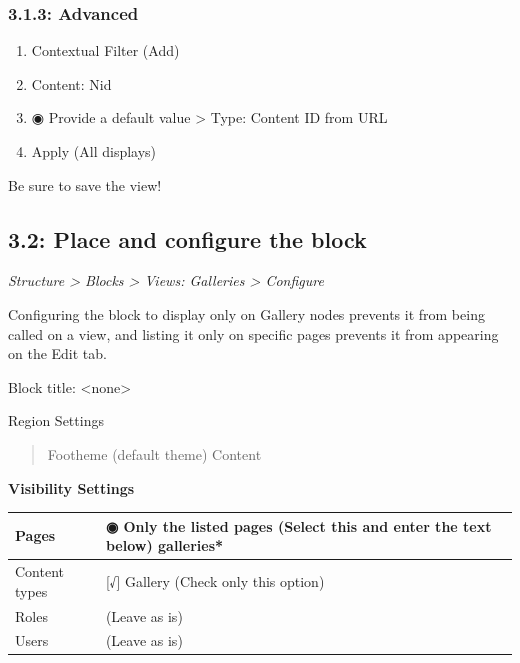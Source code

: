 \documentclass[letterpaper,10pt,english]{sphinxmanual}
\begin{document}
\subsubsection{3.1.3: Advanced}
\label{slides:advanced}\begin{enumerate}
\item {} 
Contextual Filter (Add)

\item {} 
Content: Nid

\item {} 
◉ Provide a default value \textgreater{} Type: Content ID from URL

\item {} 
Apply (All displays)

\end{enumerate}

Be sure to save the view!


\subsection{3.2: Place and configure the block}
\label{slides:place-and-configure-the-block}
\emph{Structure \textgreater{} Blocks \textgreater{} Views: Galleries \textgreater{} Configure}

Configuring the block to display only on Gallery nodes prevents it from being called on a view, and listing it only on specific pages prevents it from appearing on the Edit tab.

Block title:  \textless{}none\textgreater{}

Region Settings
\begin{quote}

Footheme (default theme)
Content
\end{quote}

\textbf{Visibility Settings}

\begin{tabulary}{\linewidth}{|L|L|}
\hline

Pages
 & 
◉ Only the listed pages (Select this and enter the text below)
galleries*
\\\hline

Content types
 & 
{[}√{]} Gallery (Check only this option)
\\\hline

Roles
 & 
(Leave as is)
\\\hline

Users
 & 
(Leave as is)
\\\hline
\end{tabulary}
\end{document}
